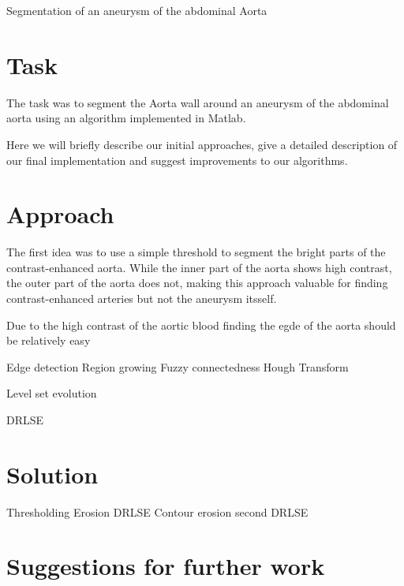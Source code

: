 \documentclass[a4paper]{scrartcl}
\begin{document}
Segmentation of an aneurysm of the abdominal Aorta



\section{Task}

The task was to segment the Aorta wall around an aneurysm of the abdominal
aorta using an algorithm implemented in Matlab. 

Here we will briefly describe our initial approaches, give a detailed
description of our final implementation and suggest improvements to our
algorithms.

\section{Approach}

The first idea was to use a simple threshold to segment the bright parts of the
contrast-enhanced aorta. While the inner part of the aorta shows high contrast,
the outer part of the aorta does not, making this approach valuable for finding
contrast-enhanced arteries but not the aneurysm itsself.

Due to the high contrast of the aortic blood finding the egde of the aorta
should be relatively easy 


Edge detection
Region growing
Fuzzy connectedness
Hough Transform

Level set evolution

DRLSE

\section{Solution}

Thresholding
Erosion
DRLSE
Contour erosion
second DRLSE



\section{Suggestions for further work}
\end{document}
